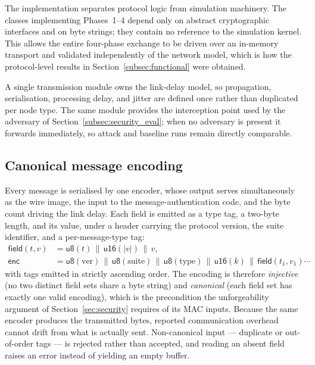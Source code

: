 \documentclass[11pt,a4paper]{article}
\begin{document}
The implementation separates protocol logic from simulation machinery. The classes
implementing Phases~1--4 depend only on abstract cryptographic interfaces and on
byte strings; they contain no reference to the simulation kernel. This allows the
entire four-phase exchange to be driven over an in-memory transport and validated
independently of the network model, which is how the protocol-level results in
Section~\ref{subsec:functional} were obtained.

A single transmission module owns the link-delay model, so propagation,
serialisation, processing delay, and jitter are defined once rather than
duplicated per node type. The same module provides the interception point used by
the adversary of Section~\ref{subsec:security_eval}; when no adversary is present
it forwards immediately, so attack and baseline runs remain directly comparable.

\subsection{Canonical message encoding}

Every message is serialised by one encoder, whose output serves simultaneously as
the wire image, the input to the message-authentication code, and the byte count
driving the link delay. Each field is emitted as a type tag, a two-byte length,
and its value, under a header carrying the protocol version, the suite identifier,
and a per-message-type tag:
%
\begin{align}
\mathsf{field}(t,v) &= \mathsf{u8}(t)\,\|\,\mathsf{u16}(|v|)\,\|\,v,\\[0.5ex]
\mathsf{enc} &= \mathsf{u8}(\mathrm{ver})\,\|\,\mathsf{u8}(\mathrm{suite})\,\|\,
                \mathsf{u8}(\mathrm{type})\,\|\,\mathsf{u16}(k)\,\|\,
                \mathsf{field}(t_1,v_1)\cdots
\end{align}
%
with tags emitted in strictly ascending order. The encoding is therefore
\emph{injective} (no two distinct field sets share a byte string) and
\emph{canonical} (each field set has exactly one valid encoding), which is the
precondition the unforgeability argument of Section~\ref{sec:security} requires of
its MAC inputs. Because the same encoder produces the transmitted bytes, reported
communication overhead cannot drift from what is actually sent. Non-canonical
input --- duplicate or out-of-order tags --- is rejected rather than accepted, and
reading an absent field raises an error instead of yielding an empty buffer.
\end{document}
